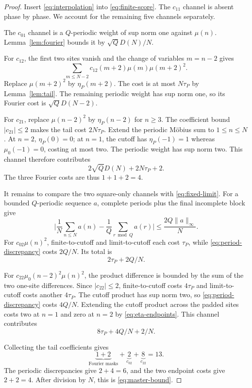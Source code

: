 \documentclass[11pt]{article}
\theoremstyle{definition}
\theoremstyle{remark}
\newcommand{\mob}{\mu}
\newcommand{\abs}[1]{\lvert#1\rvert}
\newcommand{\norm}[1]{\lVert#1\rVert}
\begin{document}
\begin{proof}
Insert \eqref{eq:interpolation} into \eqref{eq:finite-score}.  The
$c_{11}$ channel is absent phase by phase.  We account for the remaining
five channels separately.

The $c_{01}$ channel is a $Q$-periodic weight of sup norm one against
$\mob(n)$.  Lemma~\ref{lem:fourier} bounds it by
$\sqrt QD(N)/N$.

For $c_{12}$, the first two sites vanish and the change of variables
$m=n-2$ gives
\[
 \sum_{m\le N-2}c_{12}(m+2)\mob(m)\mob(m+2)^2.
\]
Replace $\mob(m+2)^2$ by $\eta_P(m+2)$.  The cost is at most
$N\tau_P$ by Lemma~\ref{lem:tail}.  The remaining periodic weight has sup
norm one, so its Fourier cost is $\sqrt QD(N-2)$.

For $c_{21}$, replace $\mob(n-2)^2$ by $\eta_P(n-2)$ for $n\ge3$.
The coefficient bound $\abs{c_{21}}\le2$ makes the tail cost
$2N\tau_P$.  Extend the periodic M\"obius sum to $1\le n\le N$.
At $n=2$, $\eta_P(0)=0$; at $n=1$, the cutoff has
$\eta_P(-1)=1$ whereas $\mob_0(-1)=0$, costing at most two.  The periodic
weight has sup norm two.  This channel therefore contributes
\[
                    2\sqrt QD(N)+2N\tau_P+2.
\]
The three Fourier costs are thus $1+1+2=4$.

It remains to compare the two square-only channels with
\eqref{eq:fixed-limit}.  For a bounded $Q$-periodic sequence $a$, complete
periods plus the final incomplete block give
\begin{equation}
 \abs{\frac1N\sum_{n\le N}a(n)-\frac1Q\sum_{r\bmod Q}a(r)}
 \le\frac{2Q\norm a_\infty}{N}.
 \label{eq:period-discrepancy}
\end{equation}
For $c_{02}\mob(n)^2$, finite-to-cutoff and
limit-to-cutoff each cost $\tau_P$, while
\eqref{eq:period-discrepancy} costs $2Q/N$.  Its total is
\begin{equation}
                         2\tau_P+2Q/N.
 \label{eq:c02-cost}
\end{equation}

For $c_{22}\mob_0(n-2)^2\mob(n)^2$, the product difference is bounded by
the sum of the two one-site differences.  Since
$\abs{c_{22}}\le2$, finite-to-cutoff costs $4\tau_P$ and
limit-to-cutoff costs another $4\tau_P$.  The cutoff product has sup norm
two, so \eqref{eq:period-discrepancy} costs $4Q/N$.  Extending the cutoff
product across the padded sites costs two at $n=1$ and zero at $n=2$ by
\eqref{eq:eta-endpoints}.  This channel contributes
\begin{equation}
                         8\tau_P+4Q/N+2/N.
 \label{eq:c22-cost}
\end{equation}

Collecting the tail coefficients gives
\[
 \underbrace{1+2}_{\text{Fourier masks}}
 +\underbrace{2}_{c_{02}}
 +\underbrace{8}_{c_{22}}=13.
\]
The periodic discrepancies give $2+4=6$, and the two endpoint costs give
$2+2=4$.  After division by $N$, this is
\eqref{eq:master-bound}.
\end{proof}
\end{document}
